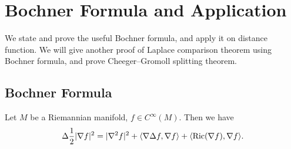 \chapter{Bochner Formula and Application}
We state and prove the useful Bochner formula, and apply it on distance function.
We will give another proof of Laplace comparison theorem using Bochner formula, and prove Cheeger--Gromoll splitting theorem.

\section{Bochner Formula}

\begin{thm}
    Let $M$ be a Riemannian manifold, $f\in C^\infty(M)$. Then we have
    \[\Delta\frac{1}{2}|\nabla f|^2=|\nabla^2 f|^2+\langle\nabla\Delta f,\nabla f\rangle+\langle\operatorname{Ric}(\nabla f),\nabla f\rangle.\]
\end{thm}